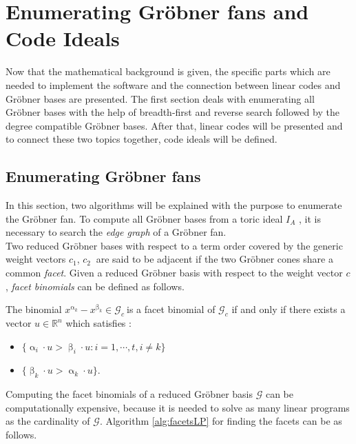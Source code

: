 
\section{Enumerating Gröbner fans and Code Ideals}
\label{sec:enumerate}

Now that the mathematical background is given, the specific parts which are needed to implement the software and the connection between linear codes and Gröbner bases are presented. The first section deals with enumerating all Gröbner bases with the help of breadth-first and reverse search followed by the degree compatible Gröbner bases.
After that, linear codes will be presented and to connect these two topics together, code ideals will be defined. 

\subsection{Enumerating Gröbner fans}
\label{subsec:enumerate}

In this section, two algorithms will be explained with the  purpose to enumerate the Gröbner fan.
To compute all Gröbner bases from a toric ideal $I_A$ , it is necessary to search the \textit{edge graph} of a Gröbner fan.\\
Two reduced Gröbner bases with respect to a term order covered by the generic weight vectors $c_{1}$, $c_{2}~$ are said to be adjacent if the two Gröbner cones share a common \textit{facet}. Given a reduced Gröbner basis with respect to the weight vector $c$, \textit{facet binomials} can be defined as follows.

\begin{env_definition}
\cite{tigers}
The binomial $x^{\upalpha_{k}}-x^{\upbeta_k} \in \mathcal{G}_c~$is a facet binomial of $\mathcal{G}_c$ if and only if there exists a vector $u \in \mathbb{R}^{n}$ which satisfies :

\begin{itemize}
\item
$ \lbrace \upalpha_{i} \cdot u > \upbeta_{i} \cdot u : i = 1, \cdots , t, i \neq k \rbrace  
$
\item
$ \lbrace \upbeta_{k} \cdot u > \upalpha_{k} \cdot u \rbrace .$
\end{itemize}


\end{env_definition}
Computing the facet binomials of a reduced Gröbner basis $\mathcal{G}$ can be computationally expensive, because it is needed to solve as many linear programs as the cardinality of $\mathcal{G}$. Algorithm \ref{alg:facetsLP} for finding the facets can be as follows.

